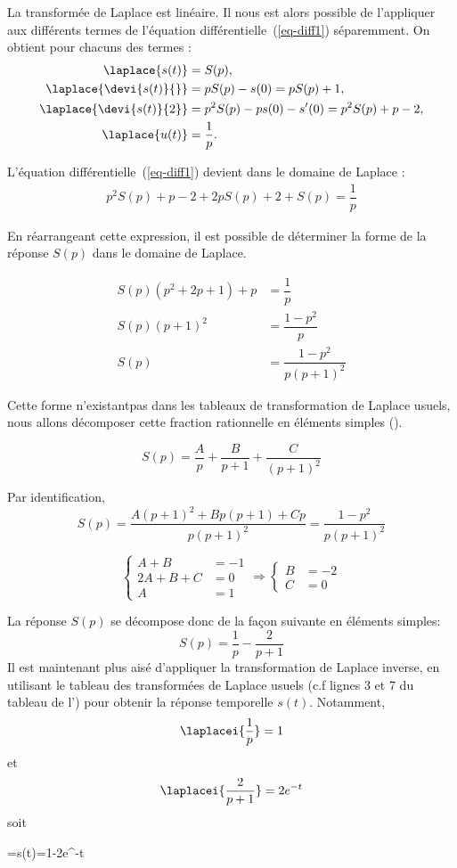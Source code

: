 La transformée de Laplace est linéaire. Il nous est alors possible
de l'appliquer aux différents termes de l'équation 
différentielle~(\ref{eq-diff1}) séparemment.
On obtient pour chacuns des termes :
\begin{align*}
    \laplace{s(t)} &= S(p), \\
    \laplace{\devi{s(t)}{}} &= pS(p)-s(0) = pS(p) +1, \\
    \laplace{\devi{s(t)}{2}} &= p^2S(p)-ps(0)-s'(0) = p^2S(p) + p -2,\\
    \laplace{u(t)} &= \dfrac{1}{p}.
\end{align*}

L'équation différentielle~(\ref{eq-diff1}) devient dans le domaine 
de Laplace :
\begin{align*}
p^2S(p)+p-2+2pS(p)+2+S(p)=\dfrac{1}{p} 
\end{align*}

En réarrangeant cette expression, il est possible de déterminer la 
forme de la réponse $S(p)$ dans le domaine de Laplace.

\begin{align*}
    S(p)\left(p^2+2p+1\right)+p&=\dfrac{1}{p} \\
    S(p)\left(p+1\right)^2 &= \dfrac{1-p^2}{p}\\
    S(p)&= \dfrac{1-p^2}{p\left(p+1\right)^2}
\end{align*}

Cette forme \og n'existant\fg pas dans les tableaux de transformation 
de Laplace usuels, nous allons décomposer cette
fraction rationnelle en éléments simples ().

$$
S(p)=\dfrac{A}{p}+\dfrac{B}{p+1}+\dfrac{C}{(p+1)^2}
$$

Par identification, 
$$
S(p)=\dfrac{A(p+1)^2+Bp(p+1)+Cp}{p(p+1)^2}=\dfrac{1-p^2}{p\left(p+1\right)^2}
$$

$$
\begin{cases}
    A+B&=-1 \\
    2A+B+C&=0 \\
    A&=1   
\end{cases}\Rightarrow
\begin{cases}
    B&=-2\\
    C&=0
\end{cases}
$$

La réponse $S(p)$ se décompose donc de la façon suivante en éléments simples:
$$
S(p)=\dfrac{1}{p}-\dfrac{2}{p+1}
$$
Il est maintenant plus aisé d'appliquer la transformation de Laplace inverse, 
en utilisant le tableau des transformées de Laplace usuels 
(c.f lignes 3 et 7 du tableau de l') pour obtenir la 
réponse temporelle $s(t)$. Notamment,
$$
\laplacei{\dfrac{1}{p}}=1
$$
et
$$
\laplacei{\dfrac{2}{p+1}}=2e^{-t}
$$
soit 
\begin{bequation}
    =s(t)=1-2e^{-t}
\end{bequation}

